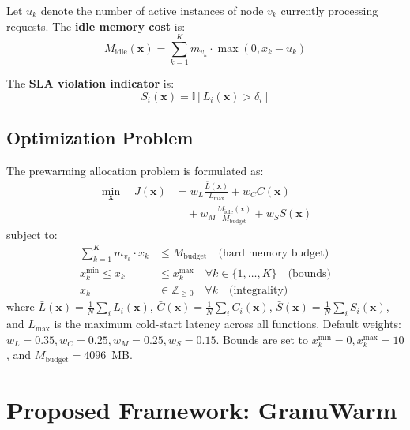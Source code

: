 \documentclass[final,5p,times,twocolumn]{elsarticle}
\begin{document}
Let $u_k$ denote the number of active instances of node $v_k$ currently processing requests. The \textbf{idle memory cost} is:
\begin{equation}
M_{\text{idle}}(\mathbf{x}) = \sum_{k=1}^{K} m_{v_k} \cdot \max(0, x_k - u_k)
\end{equation}

The \textbf{SLA violation indicator} is:
\begin{equation}
S_i(\mathbf{x}) = \mathbb{I}[L_i(\mathbf{x}) > \delta_i]
\end{equation}

\subsection{Optimization Problem}

The prewarming allocation problem is formulated as:
\begin{equation}
\begin{split}
\min_{\mathbf{x}} \quad J(\mathbf{x}) &= w_L \frac{\bar{L}(\mathbf{x})}{L_{\max}} + w_C \bar{C}(\mathbf{x}) \\
&\quad + w_M \frac{M_{\text{idle}}(\mathbf{x})}{M_{\text{budget}}} + w_S \bar{S}(\mathbf{x})
\end{split}
\end{equation}
subject to:
\begin{align}
\sum_{k=1}^{K} m_{v_k} \cdot x_k &\leq M_{\text{budget}} \quad \text{(hard memory budget)} \\
x_k^{\min} \leq x_k &\leq x_k^{\max} \quad \forall k \in \{1, \ldots, K\} \quad \text{(bounds)} \\
x_k &\in \mathbb{Z}_{\geq 0} \quad \forall k \quad \text{(integrality)}
\end{align}
where $\bar{L}(\mathbf{x}) = \frac{1}{N}\sum_i L_i(\mathbf{x})$, $\bar{C}(\mathbf{x}) = \frac{1}{N}\sum_i C_i(\mathbf{x})$, $\bar{S}(\mathbf{x}) = \frac{1}{N}\sum_i S_i(\mathbf{x})$, and $L_{\max}$ is the maximum cold-start latency across all functions. Default weights: $w_L = 0.35, w_C = 0.25, w_M = 0.25, w_S = 0.15$. Bounds are set to $x_k^{\min} = 0, x_k^{\max} = 10$, and $M_{\text{budget}} = 4096$~MB.

\section{Proposed Framework: GranuWarm}
\end{document}
